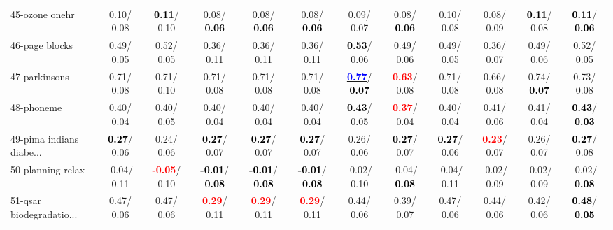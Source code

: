 \begin{table}[h]
\begin{center}
{\begin{tabular}{lc|c|c|c|c|c|c|c|c|c|c}
45-ozone onehr &   0.10/  0.08 & \textcolor{black}{\textbf{  0.11}}/  0.10 &   0.08/\textcolor{black}{\textbf{  0.06}} &   0.08/\textcolor{black}{\textbf{  0.06}} &   0.08/\textcolor{black}{\textbf{  0.06}} &   0.09/  0.07 &   0.08/\textcolor{black}{\textbf{  0.06}} &   0.10/  0.08 &   0.08/  0.09 & \textcolor{black}{\textbf{  0.11}}/  0.08 & \textcolor{black}{\textbf{  0.11}}/\textcolor{black}{\textbf{  0.06}} \\
46-page blocks &   0.49/  0.05 &   0.52/  0.05 &   0.36/  0.11 &   0.36/  0.11 &   0.36/  0.11 & \textcolor{black}{\textbf{  0.53}}/  0.06 &   0.49/  0.06 &   0.49/  0.05 &   0.36/  0.07 &   0.49/  0.06 &   0.52/  0.05 \\ \hline
47-parkinsons &   0.71/  0.08 &   0.71/  0.10 &   0.71/  0.08 &   0.71/  0.08 &   0.71/  0.08 & \underline{\textcolor{blue}{\textbf{  0.77}}}/\textcolor{black}{\textbf{  0.07}} & \textcolor{red}{\textbf{  0.63}}/  0.08 &   0.71/  0.08 &   0.66/  0.08 &   0.74/\textcolor{black}{\textbf{  0.07}} &   0.73/  0.08 \\
48-phoneme &   0.40/  0.04 &   0.40/  0.05 &   0.40/  0.04 &   0.40/  0.04 &   0.40/  0.04 & \textcolor{black}{\textbf{  0.43}}/  0.05 & \textcolor{red}{\textbf{  0.37}}/  0.04 &   0.40/  0.04 &   0.41/  0.06 &   0.41/  0.04 & \textcolor{black}{\textbf{  0.43}}/\textcolor{black}{\textbf{  0.03}} \\
49-pima indians diabe... & \textcolor{black}{\textbf{  0.27}}/  0.06 &   0.24/  0.06 & \textcolor{black}{\textbf{  0.27}}/  0.07 & \textcolor{black}{\textbf{  0.27}}/  0.07 & \textcolor{black}{\textbf{  0.27}}/  0.07 &   0.26/  0.06 & \textcolor{black}{\textbf{  0.27}}/  0.07 & \textcolor{black}{\textbf{  0.27}}/  0.06 & \textcolor{red}{\textbf{  0.23}}/  0.07 &   0.26/  0.07 & \textcolor{black}{\textbf{  0.27}}/  0.08 \\
50-planning relax &  -0.04/  0.11 & \textcolor{red}{\textbf{ -0.05}}/  0.10 & \textcolor{black}{\textbf{ -0.01}}/\textcolor{black}{\textbf{  0.08}} & \textcolor{black}{\textbf{ -0.01}}/\textcolor{black}{\textbf{  0.08}} & \textcolor{black}{\textbf{ -0.01}}/\textcolor{black}{\textbf{  0.08}} &  -0.02/  0.10 &  -0.04/\textcolor{black}{\textbf{  0.08}} &  -0.04/  0.11 &  -0.02/  0.09 &  -0.02/  0.09 &  -0.02/\textcolor{black}{\textbf{  0.08}} \\
51-qsar biodegradatio... &   0.47/  0.06 &   0.47/  0.06 & \textcolor{red}{\textbf{  0.29}}/  0.11 & \textcolor{red}{\textbf{  0.29}}/  0.11 & \textcolor{red}{\textbf{  0.29}}/  0.11 &   0.44/  0.06 &   0.39/  0.07 &   0.47/  0.06 &   0.44/  0.06 &   0.42/  0.06 & \textcolor{black}{\textbf{  0.48}}/\textcolor{black}{\textbf{  0.05}} \\

\end{tabular}}
\end{center}
\end{table}
